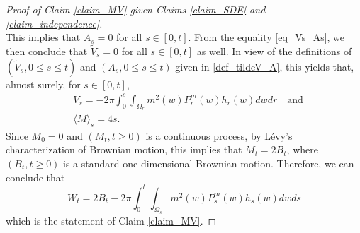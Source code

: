 \documentclass{article}
\theoremstyle{definition}
\theoremstyle{remark}
\theoremstyle{remark}
\begin{document}
\begin{proof}[Proof of Claim \ref{claim_MV} given Claims \ref{claim_SDE} and \ref{claim_independence}]
\begin{equation*}
\end{equation*}
This implies that $A_s = 0$ for all $s \in [0,t]$. From the equality \eqref{eq_Vs_As}, we then conclude that $\tilde V_s = 0$ for all $s \in [0,t]$ as well. In view of the definitions of $(\tilde V_s, 0 \leq s \leq t)$ and $(A_s, 0 \leq s \leq t)$ given in \eqref{def_tildeV_A}, this yields that, almost surely, for $s \in [0,t]$,
\begin{align*}
    &V_s = -2\pi \int_{0}^{s} \int_{\Omega_r} m^2(w)P_r^m(w)h_r(w)dwdr \quad \text{and}\\
    &\langle M \rangle_s = 4s.
\end{align*}
Since $M_0=0$ and $(M_t, t \geq 0)$ is a continuous process, by L\'evy's characterization of Brownian motion, this implies that $M_t=2B_t$, where $(B_t, t \geq 0)$ is a standard one-dimensional Brownian motion. Therefore, we can conclude that
\begin{equation*}
    W_t = 2B_t - 2\pi \int_{0}^{t} \int_{\Omega_s} m^2(w) P_s^m(w)h_s(w)dwds
\end{equation*}
which is the statement of Claim \ref{claim_MV}.
\end{proof}
\end{document}
